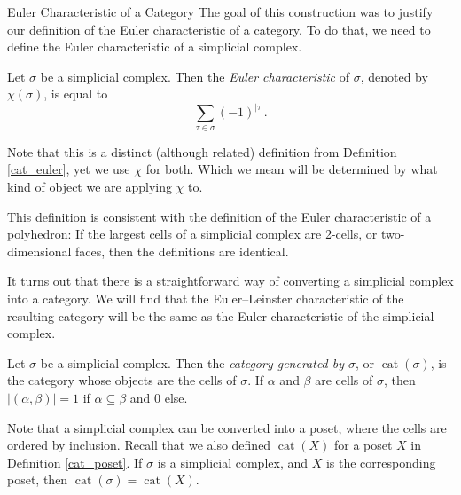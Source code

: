 \documentclass[12pt]{pom_thesis}
\DeclareMathOperator{\cat}{cat}
\begin{document}
\begin{chapter}{Euler Characteristic of a Category}
The goal of this construction was to justify our definition of the Euler characteristic of a category. To do that, we need to define the Euler characteristic of a simplicial complex.
\begin{defn}
Let $\sigma$ be a simplicial complex. Then the \emph{Euler characteristic} of $\sigma$, denoted by $\chi(\sigma)$, is equal to
\[
\sum_{\tau \in \sigma}(-1)^{|\tau|}.
\]
\end{defn}
Note that this is a distinct (although related) definition from Definition \ref{cat_euler}, yet we use $\chi$ for both. Which we mean will be determined by what kind of object we are applying $\chi$ to. 

This definition is consistent with the definition of the Euler characteristic of a polyhedron: If the largest cells of a simplicial complex are 2-cells, or two-dimensional faces, then the definitions are identical. 

It turns out that there is a straightforward way of converting a simplicial complex into a category. We will find that the Euler--Leinster characteristic of the resulting category will be the same as the Euler characteristic of the simplicial complex. 
\begin{defn}
Let $\sigma$ be a simplicial complex. Then the \emph{category generated by $\sigma$}, or $\cat(\sigma)$, is the category whose objects are the cells of $\sigma$. If $\alpha$ and $\beta$ are cells of $\sigma$, then $|(\alpha, \beta)| = 1$ if $\alpha \subseteq \beta$ and 0 else.
\end{defn}
Note that a simplicial complex can be converted into a poset, where the cells are ordered by inclusion. Recall that we also defined $\cat(X)$ for a poset $X$ in Definition \ref{cat_poset}. If $\sigma$ is a simplicial complex, and $X$ is the corresponding poset, then $\cat(\sigma) = \cat(X)$.


\end{chapter}
\end{document}
